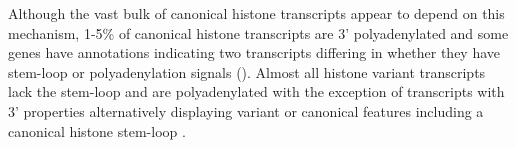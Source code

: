 	Although the vast bulk of canonical histone transcripts appear to depend on this mechanism, 
	1-5\% of canonical histone transcripts are 3' polyadenylated  
	and some genes have annotations indicating two transcripts 
	differing in whether they have stem-loop or polyadenylation signals (). 
	Almost all histone variant transcripts lack the stem-loop and are polyadenylated 
	with the exception of transcripts with 3' properties alternatively displaying
	variant or canonical features including a canonical histone stem-loop \citep{HTwoAX-transcripts}. 



